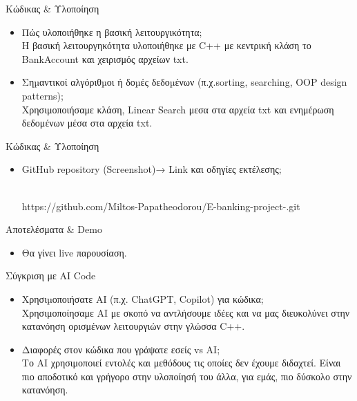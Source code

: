 \documentclass{beamer}
\begin{document}
\begin{frame}{Κώδικας \& Υλοποίηση}
\begin{itemize}
  \item Πώς υλοποιήθηκε η βασική λειτουργικότητα;
  \vspace{0.2cm}
  \\ Η βασική λειτουργηκότητα υλοποιήθηκε με C++ με κεντρική κλάση το BankAccount και χειρισμός αρχείων txt.
  \vspace{0.5cm}
  \item Σηµαντικοί αλγόριθµοι ή δοµές δεδοµένων (π.χ.sorting, searching, OOP design patterns);
  \vspace{0.2cm}
  \\ Χρησιμοποιήσαμε κλάση, Linear Search μεσα στα αρχεία txt και ενημέρωση δεδομένων μέσα στα αρχεία txt.
  \vspace{0.5cm}
  
  
\end{itemize}
\end{frame}

\begin{frame}{Κώδικας \& Υλοποίηση}
\begin{itemize}
  \item GitHub repository (Screenshot)→ Link και οδηγίες εκτέλεσης;
  
  \\ https://github.com/Miltos-Papatheodorou/E-banking-project-.git
\end{itemize}
\end{frame}

\begin{frame}{Αποτελέσματα \& Demo}
\begin{itemize}
  \item Θα γίνει live παρουσίαση.
\end{itemize}
\end{frame}

\begin{frame}{Σύγκριση με AI Code}
\begin{itemize}
  \item Χρησιµοποιήσατε AI (π.χ. ChatGPT, Copilot) για κώδικα; 
  \vspace{0.2cm}
  \\Χρησιμοποίησαμε ΑΙ με σκοπό να αντλήσουμε ιδέες και να μας διευκολύνει στην κατανόηση ορισμένων λειτουργιών στην γλώσσα C++.
  \vspace{0.5cm}
  \item Διαφορές στον κώδικα που γράψατε εσείς vs AI;
  \vspace{0.2cm}
  \\ Το ΑΙ χρησιμοποιεί εντολές και μεθόδους τις οποίες δεν έχουμε διδαχτεί. Είναι πιο αποδοτικό και γρήγορο στην υλοποίησή του άλλα, για εμάς, πιο δύσκολο στην κατανόηση. 
\end{itemize}
\end{frame}
\end{document}
